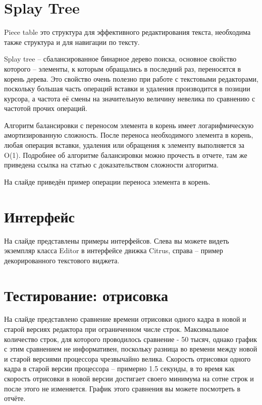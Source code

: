 \documentclass{article}
\begin{document}
    \section{Splay Tree}
        \par Piece table это структура для эффективного редактирования текста, необходима также 
        структура и для навигации по тексту.
        \par Splay tree – сбалансированное бинарное дерево поиска, основное свойство которого – 
        элементы, к которым обращались в последний раз, переносятся в корень дерева. Это 
        свойство очень полезно при работе с текстовыми редакторами, поскольку большая часть 
        операций вставки и удаления производится в позиции курсора, а частота её смены на 
        значительную величину невелика по сравнению с частотой прочих операций.
        \par Алгоритм балансировки с переносом элемента в корень имеет логарифмическую 
        амортизированную сложность. После переноса необходимого элемента в корень, любая 
        операция вставки, удаления или обращения к элементу выполняется за O(1). Подробнее об 
        алгоритме балансировки можно прочесть в отчете, там же приведена ссылка на статью с 
        доказательством сложности алгоритма.
        \par На слайде приведён пример операции переноса элемента в корень.
    \section{Интерфейс}
        \par На слайде представлены примеры интерфейсов. Слева вы можете видеть экземпляр класса
        Editor в интерфейсе движка Citrus, справа -- пример декорированного текстового виджета.
    \section{Тестирование: отрисовка}
        \par На слайде представлено сравнение времени отрисовки одного кадра в новой и старой
        версиях редактора при ограниченном числе строк. Максимальное количество строк, для
        которого проводилось сравнение - 50 тысяч, однако график с этим сравнением не 
        информативен, поскольку разница во времени между новой и старой версиями процессора 
        чрезвычайно велика. Скорость отрисовки одного кадра в старой версии процессора --
        примерно 1.5 секунды, в то время как скорость отрисовки в новой версии достигает своего
        минимума на сотне строк и после этого не изменяется. График этого сравнения вы можете
        посмотреть в отчёте.
\end{document}

